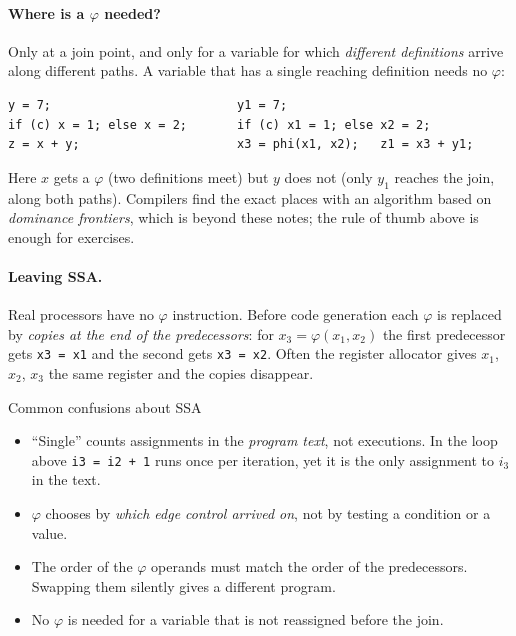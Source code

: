 \documentclass[11pt,a4paper]{article}
\begin{document}
\paragraph{Where is a $\varphi$ needed?} Only at a join point, and only for a variable for which \emph{different definitions} arrive along different paths. A variable that has a single reaching definition needs no $\varphi$:
\begin{lstlisting}
y = 7;                          y1 = 7;
if (c) x = 1; else x = 2;       if (c) x1 = 1; else x2 = 2;
z = x + y;                      x3 = phi(x1, x2);   z1 = x3 + y1;
\end{lstlisting}
Here $x$ gets a $\varphi$ (two definitions meet) but $y$ does not (only $y_1$ reaches the join, along both paths). Compilers find the exact places with an algorithm based on \emph{dominance frontiers}, which is beyond these notes; the rule of thumb above is enough for exercises.

\paragraph{Leaving SSA.} Real processors have no $\varphi$ instruction. Before code generation each $\varphi$ is replaced by \emph{copies at the end of the predecessors}: for $x_3=\varphi(x_1,x_2)$ the first predecessor gets \texttt{x3 = x1} and the second gets \texttt{x3 = x2}. Often the register allocator gives $x_1$, $x_2$, $x_3$ the same register and the copies disappear.

\begin{pitfallbox}{Common confusions about SSA}
\begin{itemize}[nosep]
\item ``Single'' counts assignments in the \emph{program text}, not executions. In the loop above \texttt{i3 = i2 + 1} runs once per iteration, yet it is the only assignment to $i_3$ in the text.
\item $\varphi$ chooses by \emph{which edge control arrived on}, not by testing a condition or a value.
\item The order of the $\varphi$ operands must match the order of the predecessors. Swapping them silently gives a different program.
\item No $\varphi$ is needed for a variable that is not reassigned before the join.
\end{itemize}
\end{pitfallbox}

\end{document}
